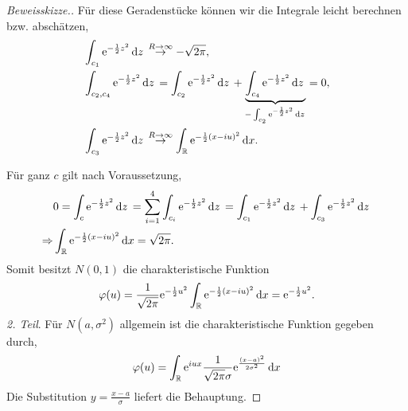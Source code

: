 \begin{proof}[Beweisskizze.]
 Für diese Geradenstücke können wir die Integrale
leicht berechnen bzw. abschätzen,
\begin{align*}
&\int_{c_1} \mathrm{e}^{-\frac{1}{2}z^2}\,\mathrm{d} z\, \overset{R\to\infty}{\to} -\sqrt{2\pi},\\
&\int_{c_2,c_4} \mathrm{e}^{-\frac{1}{2}z^2}\,\mathrm{d} z\, = \int_{c_2} \mathrm{e}^{-\frac{1}{2}z^2}\,\mathrm{d} z\, +
\underbrace{\int_{c_4} \mathrm{e}^{-\frac{1}{2}z^2}\,\mathrm{d} z\,}_{-\int_{c_2}
\mathrm{e}^{-\frac{1}{2}z^2}\,\mathrm{d} z\,} = 0,\\
&\int_{c_3} \mathrm{e}^{-\frac{1}{2}z^2}\,\mathrm{d} z\, \overset{R\to\infty}{\to} \int_{\mathbb{R}}
\mathrm{e}^{-\frac{1}{2}(x-iu)^2}\,\mathrm{d} x.
\end{align*}

Für ganz $c$ gilt nach Voraussetzung,
\begin{align*}
&0 = \int_c \mathrm{e}^{-\frac{1}{2}z^2} \,\mathrm{d} z\, =
\sum_{i=1}^4
\int_{c_i}
\mathrm{e}^{-\frac{1}{2}z^2}\,\mathrm{d} z\,
= 
\int_{c_1} \mathrm{e}^{-\frac{1}{2}z^2}\,\mathrm{d} z\, +
\int_{c_3} \mathrm{e}^{-\frac{1}{2}z^2}\,\mathrm{d} z\,
\\
\Rightarrow 
&\int_{\mathbb{R}}
\mathrm{e}^{-\frac{1}{2}(x-iu)^2}\,\mathrm{d} x = \sqrt{2\pi}.
\end{align*}
Somit besitzt $N(0,1)$ die charakteristische Funktion
\begin{align*}
\varphi(u) = \frac{1}{\sqrt{2\pi}}\mathrm{e}^{-\frac{1}{2}u^2}\int_{\mathbb{R}}
\mathrm{e}^{-\frac{1}{2}(x-iu)^2}\,\mathrm{d} x
= \mathrm{e}^{-\frac{1}{2}u^2}.
\end{align*}
\textit{2. Teil}. Für $N(a,\sigma^2)$ allgemein ist die charakteristische
Funktion gegeben durch,
\begin{align*}
\varphi(u) = \int_{\mathbb{R}}
\mathrm{e}^{iux}\frac{1}{\sqrt{2\pi}\sigma}\mathrm{e}^{\frac{(x-a)^2}{2\sigma^2}}\,\mathrm{d} x
\end{align*}
Die Substitution $y=\frac{x-a}{\sigma}$ liefert die Behauptung.\qedhere
\end{proof}


